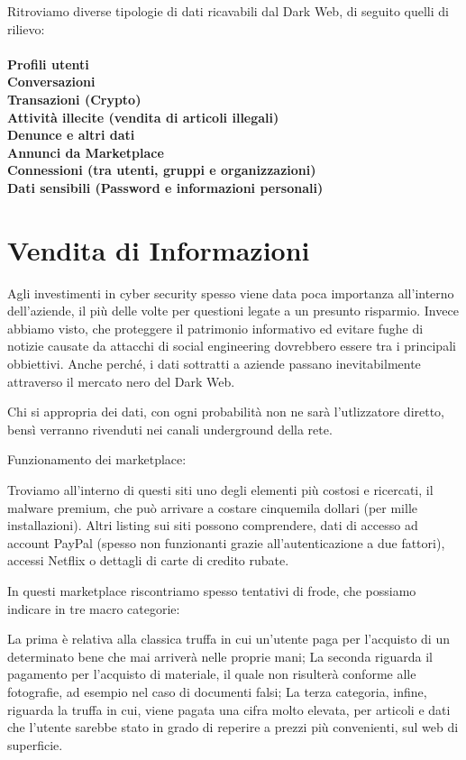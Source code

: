 Ritroviamo diverse tipologie di dati ricavabili dal Dark Web, di seguito quelli di rilievo:
\\
\textbf{\\Profili utenti
\\Conversazioni
\\Transazioni (Crypto)
\\Attività illecite (vendita di articoli illegali)
\\Denunce e altri dati
\\Annunci da Marketplace
\\Connessioni (tra utenti, gruppi e organizzazioni)
\\Dati sensibili (Password e informazioni personali)}

\section{Vendita di Informazioni}\label{sec:cap_sec_impl3}

Agli investimenti in cyber security spesso viene data poca importanza all'interno dell'aziende, il più delle volte per questioni legate a un presunto risparmio. Invece abbiamo visto, che proteggere il patrimonio informativo ed evitare fughe di notizie causate da attacchi di social engineering dovrebbero essere tra i principali obbiettivi. 
Anche perché, i dati sottratti a aziende passano inevitabilmente attraverso il mercato nero del Dark Web.

Chi si appropria dei dati, con ogni probabilità non ne sarà l'utlizzatore diretto, bensì verranno rivenduti nei canali underground della rete.

Funzionamento dei marketplace:

Troviamo all'interno di questi siti uno degli elementi più costosi e ricercati, il malware premium, che può arrivare a costare cinquemila dollari (per mille installazioni). Altri listing sui siti possono comprendere, dati di accesso ad account PayPal (spesso non funzionanti grazie all’autenticazione a due fattori), accessi Netflix o dettagli di carte di credito rubate.

In questi marketplace riscontriamo spesso tentativi di frode, che possiamo indicare in tre macro categorie:

La prima è relativa alla classica truffa in cui un'utente paga per l’acquisto di un determinato bene che mai arriverà nelle proprie mani;
La seconda riguarda il pagamento per l’acquisto di materiale, il quale non risulterà conforme alle fotografie, ad esempio nel caso di documenti falsi;
La terza categoria, infine, riguarda la truffa in cui, viene pagata una cifra molto elevata, per articoli e dati che l'utente sarebbe stato in grado di reperire a prezzi più convenienti, sul web di superficie.

